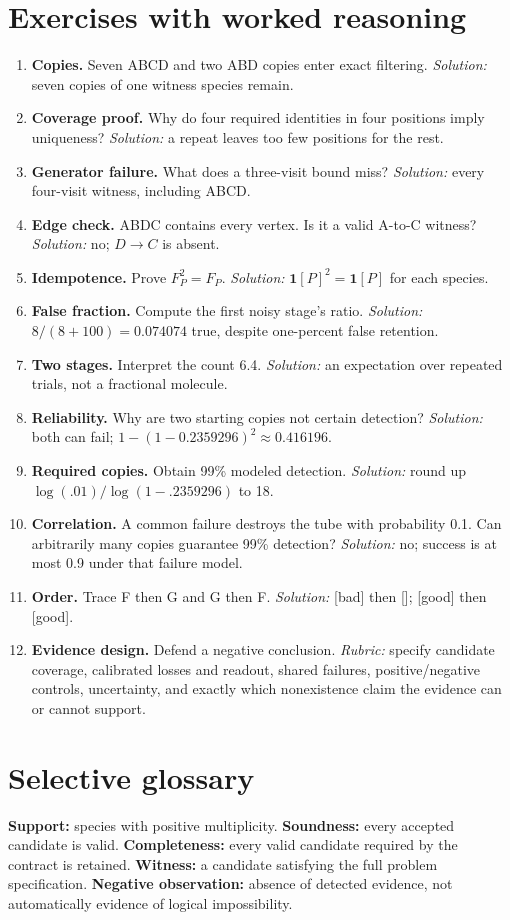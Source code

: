 \section{Exercises with worked reasoning}
\begin{enumerate}
\item \textbf{Copies.} Seven ABCD and two ABD copies enter exact filtering.
 \emph{Solution:} seven copies of one witness species remain.
\item \textbf{Coverage proof.} Why do four required identities in four positions
 imply uniqueness? \emph{Solution:} a repeat leaves too few positions for the rest.
\item \textbf{Generator failure.} What does a three-visit bound miss?
 \emph{Solution:} every four-visit witness, including ABCD.
\item \textbf{Edge check.} ABDC contains every vertex. Is it a valid A-to-C
 witness? \emph{Solution:} no; $D\to C$ is absent.
\item \textbf{Idempotence.} Prove $F_P^2=F_P$.
 \emph{Solution:} $\mathbf1[P]^2=\mathbf1[P]$ for each species.
\item \textbf{False fraction.} Compute the first noisy stage's ratio.
 \emph{Solution:} $8/(8+100)=0.074074$ true, despite one-percent false retention.
\item \textbf{Two stages.} Interpret the count 6.4.
 \emph{Solution:} an expectation over repeated trials, not a fractional molecule.
\item \textbf{Reliability.} Why are two starting copies not certain detection?
 \emph{Solution:} both can fail; $1-(1-0.2359296)^2\approx0.416196$.
\item \textbf{Required copies.} Obtain 99\% modeled detection.
 \emph{Solution:} round up $\log(.01)/\log(1-.2359296)$ to 18.
\item \textbf{Correlation.} A common failure destroys the tube with probability
 0.1. Can arbitrarily many copies guarantee 99\% detection?
 \emph{Solution:} no; success is at most 0.9 under that failure model.
\item \textbf{Order.} Trace F then G and G then F.
 \emph{Solution:} [bad] then []; [good] then [good].
\item \textbf{Evidence design.} Defend a negative conclusion.
 \emph{Rubric:} specify candidate coverage, calibrated losses and readout,
 shared failures, positive/negative controls, uncertainty, and exactly which
 nonexistence claim the evidence can or cannot support.
\end{enumerate}
\section*{Selective glossary}
\textbf{Support:} species with positive multiplicity.
\textbf{Soundness:} every accepted candidate is valid.
\textbf{Completeness:} every valid candidate required by the contract is retained.
\textbf{Witness:} a candidate satisfying the full problem specification.
\textbf{Negative observation:} absence of detected evidence, not automatically
evidence of logical impossibility.
